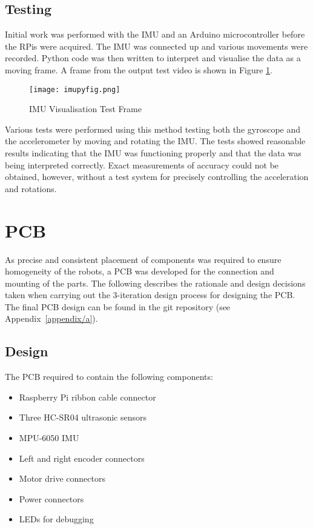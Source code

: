 \subsection{Testing}\label{elec/imu/test}
Initial work was performed with the IMU and an Arduino microcontroller
before the RPis were acquired. The IMU was connected up and various
movements were recorded. Python code was then written to interpret and
visualise the data as a moving frame. A frame from the output test video is shown in Figure \ref{fig:imu_py_test}.

\begin{figure}[!ht]
	\centering
	\texttt{[image: imupyfig.png]}
	\caption{IMU Visualisation Test Frame}\label{fig:imu_py_test}

\end{figure}

Various tests were performed using this method testing both the gyroscope and the
accelerometer by moving and rotating the IMU. The tests showed reasonable results
indicating that the IMU was functioning properly and that the data was being interpreted
correctly. Exact measurements of accuracy could not be obtained, however, without a test
system for precisely controlling the acceleration and rotations.

\section{PCB}\label{elec/pcb}
As precise and consistent placement of components was required to ensure
homogeneity of the robots, a PCB was developed for the connection
and mounting of the parts. The following
describes the rationale and design decisions taken when carrying out the
3-iteration design process for designing the PCB. The final PCB design can
be found in the git repository (see Appendix~\ref{appendix/a}).

\subsection{Design}\label{elec/pcb/design}
The PCB required to contain the following components:
\begin{itemize}
  \item Raspberry Pi ribbon cable connector
  \item Three HC-SR04 ultrasonic sensors
  \item MPU-6050 IMU
  \item Left and right encoder connectors
  \item Motor drive connectors
  \item Power connectors
  \item LEDs for debugging
\end{itemize}

